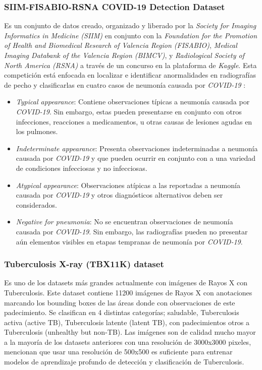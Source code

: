 \subsubsection{SIIM-FISABIO-RSNA COVID-19 Detection Dataset}

Es un conjunto de datos creado, organizado y liberado por la \textit{Society for Imaging Informatics
in Medicine (SIIM)} en conjunto con la
\textit{Foundation for the Promotion of Health and Biomedical Research of Valencia Region (FISABIO)},
\textit{Medical Imaging Databank of the Valencia Region (BIMCV)}, y
\textit{Radiological Society of North America (RSNA)} \cite{siim_det_challenge} a través de un
concurso en la plataforma de \textit{Kaggle}. Esta competición está enfocada en localizar
e identificar anormalidades en radiografías de pecho y clasificarlas en cuatro casos de neumonía
causada por \textit{COVID-19} \cite{00005382-202011000-00004}:

\begin{itemize}
    \item \textit{Typical appearance}: Contiene observaciones típicas a neumonía causada por
          \textit{COVID-19}. Sin embargo, estas pueden presentarse en conjunto con otros infecciones,
          reacciones a medicamentos, u otras causas de lesiones agudas en los pulmones.
    \item \textit{Indeterminate appearance}: Presenta observaciones indeterminadas a neumonía
          causada por \textit{COVID-19} y que pueden ocurrir en conjunto con a una variedad de
          condiciones infecciosas y no infecciosas.
    \item \textit{Atypical appearance}: Observaciones atípicas a las reportadas a neumonía causada
          por \textit{COVID-19} y otros diagnósticos alternativos deben ser considerados.
    \item \textit{Negative for pneumonia}: No se encuentran observaciones de neumonía causada por
          \textit{COVID-19}. Sin embargo, las radiografías pueden no presentar aún elementos visibles
          en etapas tempranas de neumonía por \textit{COVID-19}.
\end{itemize}

\subsubsection{Tuberculosis X-ray (TBX11K) dataset}

Es uno de los datasets más grandes actualmente con imágenes de Rayos X con Tuberculosis. Este
dataset contiene 11200 imágenes de Rayos X con anotaciones marcando los bounding boxes de las
áreas donde con observaciones de este padecimiento. Se clasifican en 4 distintas categorías;
saludable, Tuberculosis activa (active TB), Tuberculosis latente (latent TB), con padecimientos otros a
Tuberculosis (unhealthy but non-TB). Las imágenes son de calidad mucho mayor a la mayoría de los
datasets anteriores con una resolución de 3000x3000 pixeles, \citeauthor{9156613} mencionan que
usar una resolución de 500x500 es suficiente para entrenar modelos de aprendizaje profundo de
detección y clasificación de Tuberculosis.


